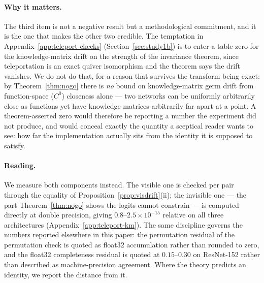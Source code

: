 \paragraph{Why it matters.}
The third item is not a negative result but a methodological commitment, and it
is the one that makes the other two credible. The temptation in Appendix~\ref{app:teleport-checks}
(Section~\ref{sec:study1b}) is to enter a table zero for the knowledge-matrix
drift on the strength of the invariance theorem, since teleportation is an exact
quiver isomorphism and the theorem says the drift vanishes. We do not do that,
for a reason that survives the transform being exact: by
Theorem~\ref{thm:nogo} there is \emph{no} bound on knowledge-matrix germ drift
from function-space ($C^0$) closeness alone --- two networks can be uniformly
arbitrarily close as functions yet have knowledge matrices arbitrarily far apart
at a point. A theorem-asserted zero would therefore be reporting a number the
experiment did not produce, and would conceal exactly the quantity a sceptical
reader wants to see: how far the implementation actually sits from the identity
it is supposed to satisfy.

\paragraph{Reading.}
We measure both components instead. The visible one is checked per pair through
the equality of Proposition~\ref{prop:visdrift}(ii); the invisible one --- the
part Theorem~\ref{thm:nogo} shows the logits cannot constrain --- is computed
directly at double precision, giving $0.8$--$2.5\times10^{-15}$ relative on all
three architectures (Appendix~\ref{app:teleport-km}). The same discipline
governs the numbers reported elsewhere in this paper: the permutation residual of
the permutation check is quoted as float32 accumulation rather than rounded to zero, and the
float32 completeness residual is quoted at $0.15$--$0.30$ on ResNet-152 rather
than described as machine-precision agreement. Where the theory predicts an
identity, we report the distance from it.

